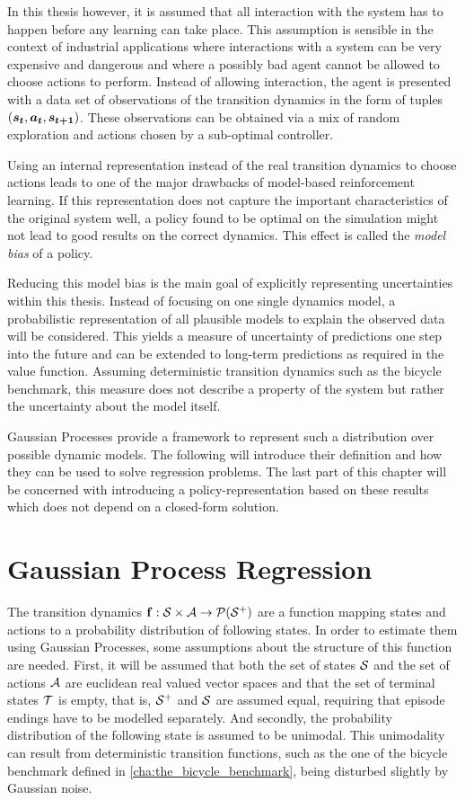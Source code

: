 In this thesis however, it is assumed that all interaction with the system has to happen before any learning can take place.
This assumption is sensible in the context of industrial applications where interactions with a system can be very expensive and dangerous and where a possibly bad agent cannot be allowed to choose actions to perform.
Instead of allowing interaction, the agent is presented with a data set of observations of the transition dynamics in the form of tuples $(\bm{s_t}, \bm{a_t}, \bm{s_{t+1}})$.
These observations can be obtained via a mix of random exploration and actions chosen by a sub-optimal controller.

Using an internal representation instead of the real transition dynamics to choose actions leads to one of the major drawbacks of model-based reinforcement learning.
If this representation does not capture the important characteristics of the original system well, a policy found to be optimal on the simulation might not lead to good results on the correct dynamics.
This effect is called the \emph{model bias} of a policy.

Reducing this model bias is the main goal of explicitly representing uncertainties within this thesis.
Instead of focusing on one single dynamics model, a probabilistic representation of all plausible models to explain the observed data will be considered.
This yields a measure of uncertainty of predictions one step into the future and can be extended to long-term predictions as required in the value function.
Assuming deterministic transition dynamics such as the bicycle benchmark, this measure does not describe a property of the system but rather the uncertainty about the model itself.

Gaussian Processes provide a framework to represent such a distribution over possible dynamic models.
The following will introduce their definition and how they can be used to solve regression problems.
The last part of this chapter will be concerned with introducing a policy-representation based on these results which does not depend on a closed-form solution.

\section{Gaussian Process Regression}
The transition dynamics $\operatorname{\mathbf{f}} : \mathcal{S} \times \mathcal{A} \to \operatorname{\mathcal{P}}(\mathcal{S}^+)$ are a function mapping states and actions to a probability distribution of following states.
In order to estimate them using Gaussian Processes, some assumptions about the structure of this function are needed.
First, it will be assumed that both the set of states $\mathcal{S}$ and the set of actions $\mathcal{A}$ are euclidean real valued vector spaces and that the set of terminal states $\mathcal{T}$ is empty, that is, $\mathcal{S}^+$ and $\mathcal{S}$ are assumed equal, requiring that episode endings have to be modelled separately.
And secondly, the probability distribution of the following state is assumed to be unimodal.
This unimodality can result from deterministic transition functions, such as the one of the bicycle benchmark defined in \cref{cha:the_bicycle_benchmark}, being disturbed slightly by Gaussian noise.

